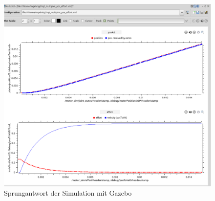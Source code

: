 \begin{figure}[!ht]
\centering
\includegraphics[angle=0,width=\textwidth]{images/motorsim_v_control_cut.png}
\caption{Sprungantwort der Simulation mit Gazebo}
\label{fig:motorsim}
\end{figure}


%
%

